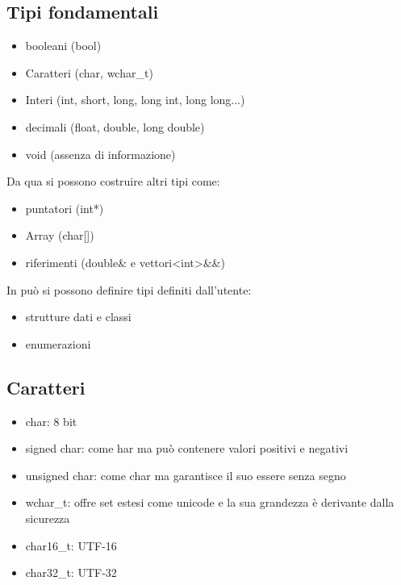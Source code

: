 \documentclass[11pt,a4paper]{book}
\begin{document}
\subsection{Tipi fondamentali}
\begin{itemize}
	\item booleani (bool)
	\item Caratteri (char, wchar\_t)
	\item Interi (int, short, long, long int, long long...)
	\item decimali (float, double, long double)
	\item void (assenza di informazione)
\end{itemize}
Da qua si possono costruire altri tipi come:
\begin{itemize}
	\item puntatori (int*)
	\item Array (char[])
	\item riferimenti (double\& e vettori<int>\&\&)
\end{itemize}
In può si possono definire tipi definiti dall'utente:
\begin{itemize}
	\item strutture dati e classi
	\item enumerazioni
\end{itemize}

\subsection{Caratteri}
\begin{itemize}
	\item char: 8 bit
	\item signed char: come har ma può contenere valori positivi e negativi
	\item unsigned char: come char ma garantisce il suo essere senza segno
	\item wchar\_t: offre set estesi come unicode e la sua grandezza è derivante dalla sicurezza
	\item char16\_t: UTF-16
	\item char32\_t: UTF-32
\end{itemize}
\end{document}

